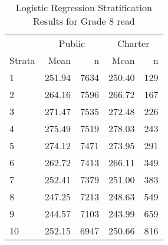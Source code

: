 \begin{table}[ht]
\centering
\caption{Logistic Regression Stratification Results for Grade 8 read} 
\label{g8read-circpsa10}
\begin{tabular}{lrr@{\extracolsep{.2cm}}rr}
  \hline
   & \multicolumn{2}{c}{Public} & \multicolumn{2}{c}{Charter} \\ \cline{2-3} \cline{4-5} Strata & Mean & n & Mean & n \\ \hline
1 & 251.94 & 7634 & 250.40 & 129 \\ 
  2 & 264.16 & 7596 & 266.72 & 167 \\ 
  3 & 271.47 & 7535 & 272.48 & 226 \\ 
  4 & 275.49 & 7519 & 278.03 & 243 \\ 
  5 & 274.12 & 7471 & 273.95 & 291 \\ 
  6 & 262.72 & 7413 & 266.11 & 349 \\ 
  7 & 252.41 & 7379 & 251.00 & 383 \\ 
  8 & 247.25 & 7213 & 248.63 & 549 \\ 
  9 & 244.57 & 7103 & 243.99 & 659 \\ 
  10 & 252.15 & 6947 & 250.66 & 816 \\ 
   \hline
\end{tabular}
\end{table}
